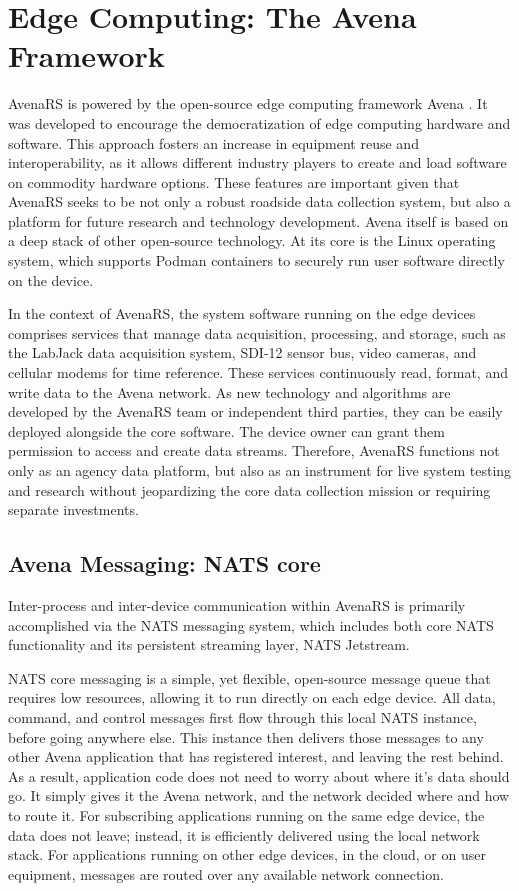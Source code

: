 \documentclass[conference]{IEEEtran}
\begin{document}
\section{Edge Computing: The Avena Framework}

AvenaRS is powered by the open-source edge computing framework Avena \cite{avena2022, gowda2025enhancing, castiblanco2024avena, castiblanco2024oatsmobile}.
It was developed to encourage the democratization of edge computing hardware and software.
This approach fosters an increase in equipment reuse and interoperability, as it allows different industry players to create and load software on commodity hardware options.
These features are important given that AvenaRS seeks to be not only a robust roadside data collection system, but also a platform for future research and technology development.
Avena itself is based on a deep stack of other open-source technology.
At its core is the Linux operating system, which supports Podman \cite{husain2023analysis} containers to securely run user software directly on the device.

In the context of AvenaRS, the system software running on the edge devices comprises services that manage data acquisition, processing, and storage, such as the LabJack data acquisition system, SDI-12 sensor bus, video cameras, and cellular modems for time reference.
These services continuously read, format, and write data to the Avena network.
As new technology and algorithms are developed by the AvenaRS team or independent third parties, they can be easily deployed alongside the core software.
The device owner can grant them permission to access and create data streams.
Therefore, AvenaRS functions not only as an agency data platform, but also as an instrument for live system testing and research without jeopardizing the core data collection mission or requiring separate investments.

\subsection{Avena Messaging: NATS core} 
Inter-process and inter-device communication within AvenaRS is primarily accomplished via the NATS messaging system, which includes both core NATS functionality and its persistent streaming layer, NATS Jetstream.

NATS core messaging is a simple, yet flexible, open-source message queue that requires low resources, allowing it to run directly on each edge device.
All data, command, and control messages first flow through this local NATS instance, before going anywhere else.
This instance then delivers those messages to any other Avena application that has registered interest, and leaving the rest behind.
As a result, application code does not need to worry about where it's data should go.
It simply gives it the Avena network, and the network decided where and how to route it.
For subscribing applications running on the same edge device, the data does not leave; instead, it is efficiently delivered using the local network stack.
For applications running on other edge devices, in the cloud, or on user equipment, messages are routed over any available network connection.
\end{document}
